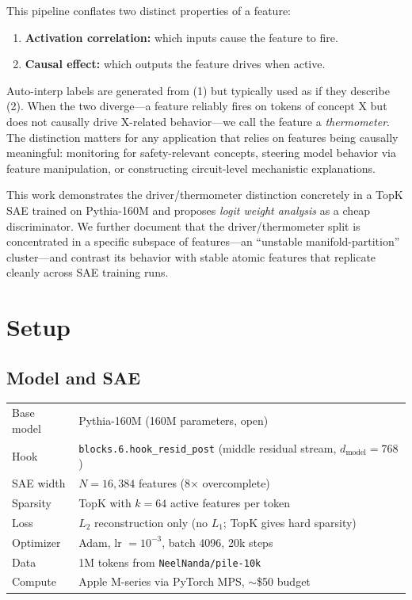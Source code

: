 \documentclass[11pt]{article}
\begin{document}
This pipeline conflates two distinct properties of a feature:
\begin{enumerate}[leftmargin=*]
  \item \textbf{Activation correlation:} which inputs cause the feature to fire.
  \item \textbf{Causal effect:} which outputs the feature drives when active.
\end{enumerate}

Auto-interp labels are generated from (1) but typically used as if they describe
(2). When the two diverge---a feature reliably fires on tokens of concept X but
does not causally drive X-related behavior---we call the feature a
\emph{thermometer}. The distinction matters for any application that relies on
features being causally meaningful: monitoring for safety-relevant concepts,
steering model behavior via feature manipulation, or constructing circuit-level
mechanistic explanations.

This work demonstrates the driver/thermometer distinction concretely in a TopK
SAE \citep{gao2024scaling} trained on Pythia-160M and proposes \emph{logit weight
analysis} as a cheap discriminator. We further document that the
driver/thermometer split is concentrated in a specific subspace of features---an
``unstable manifold-partition'' cluster---and contrast its behavior with stable
atomic features that replicate cleanly across SAE training runs.

\section{Setup}

\subsection{Model and SAE}

\begin{tabular}{ll}
\toprule
Base model & Pythia-160M (160M parameters, open) \\
Hook & \texttt{blocks.6.hook\_resid\_post} (middle residual stream, $d_{\text{model}} = 768$) \\
SAE width & $N = 16{,}384$ features (8$\times$ overcomplete) \\
Sparsity & TopK with $k = 64$ active features per token \\
Loss & $L_2$ reconstruction only (no $L_1$; TopK gives hard sparsity) \\
Optimizer & Adam, lr $= 10^{-3}$, batch 4096, 20k steps \\
Data & 1M tokens from \texttt{NeelNanda/pile-10k} \\
Compute & Apple M-series via PyTorch MPS, $\sim$\$50 budget \\
\bottomrule
\end{tabular}
\end{document}
